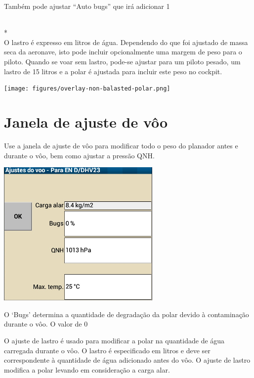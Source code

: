 Também pode ajustar “Auto bugs” que irá adicionar 1%

\blink{}\blink{}
\\*
\blink{}\blink{}\\

O lastro é expresso em litros de água.  Dependendo do que foi ajustado de massa seca da aeronave, isto pode incluir opcionalmente uma margem de peso para o piloto.  Quando se voar sem lastro, pode-se ajustar para um piloto pesado, um lastro de 15 litros e a polar é ajustada para incluir este peso no cockpit.

\begin{center}
\texttt{[image: figures/overlay-non-balasted-polar.png]}
\end{center}


\section{Janela de ajuste de vôo}\label{sec:flight-setup}
Use a janela de ajuste de vôo para modificar todo o peso do planador antes e durante o vôo, bem como ajustar a pressão QNH.

\begin{center}
\includegraphics[angle=0,width=0.45\linewidth,keepaspectratio='true']{figures/dialog-basicsettings.png}
\end{center}

O ‘Bugs’ determina a quantidade de degradação da polar devido à contaminação durante o vôo.  O valor de 0%

O ajuste de lastro é usado para modificar a polar na quantidade de água carregada durante o vôo.  O lastro é especificado em litros e deve ser correspondente à quantidade de água adicionado antes do vôo.  O ajuste de lastro modifica a polar levando em consideração a carga alar.

